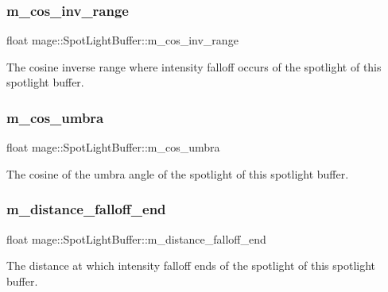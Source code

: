 \subsubsection{\texorpdfstring{m\+\_\+cos\+\_\+inv\+\_\+range}{m\_cos\_inv\_range}}
{\footnotesize\ttfamily float mage\+::\+Spot\+Light\+Buffer\+::m\+\_\+cos\+\_\+inv\+\_\+range}

The cosine inverse range where intensity falloff occurs of the spotlight of this spotlight buffer. \hypertarget{structmage_1_1_spot_light_buffer_a7a7a02e7ddfaf96c90395cd21a6c0a91}{}\label{structmage_1_1_spot_light_buffer_a7a7a02e7ddfaf96c90395cd21a6c0a91} 
\subsubsection{\texorpdfstring{m\+\_\+cos\+\_\+umbra}{m\_cos\_umbra}}
{\footnotesize\ttfamily float mage\+::\+Spot\+Light\+Buffer\+::m\+\_\+cos\+\_\+umbra}

The cosine of the umbra angle of the spotlight of this spotlight buffer. \hypertarget{structmage_1_1_spot_light_buffer_ae49f16cc01db734c72f02c963d89d0c2}{}\label{structmage_1_1_spot_light_buffer_ae49f16cc01db734c72f02c963d89d0c2} 
\subsubsection{\texorpdfstring{m\+\_\+distance\+\_\+falloff\+\_\+end}{m\_distance\_falloff\_end}}
{\footnotesize\ttfamily float mage\+::\+Spot\+Light\+Buffer\+::m\+\_\+distance\+\_\+falloff\+\_\+end}

The distance at which intensity falloff ends of the spotlight of this spotlight buffer. \hypertarget{structmage_1_1_spot_light_buffer_a3958077ae1acf0c1a5ca82711cb2d689}{}\label{structmage_1_1_spot_light_buffer_a3958077ae1acf0c1a5ca82711cb2d689} 
